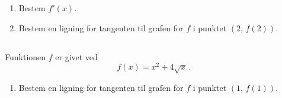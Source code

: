 \documentclass[10pt,a4paper,table]{article}
\begin{document}
\begin{enumerate}
    \item Bestem $f'(x)$.
    \item Bestem en ligning for tangenten til grafen for $f$ i punktet $(2,\,f(2))$.
\end{enumerate}

\subsection{}
Funktionen $f$ er givet ved
$$
f(x) = x^2 + 4\sqrt{x}\, .
$$

\begin{enumerate}
    \item Bestem en ligning for tangenten til grafen for $f$ i punktet $(1,\,f(1))$.
\end{enumerate}
\end{document}
